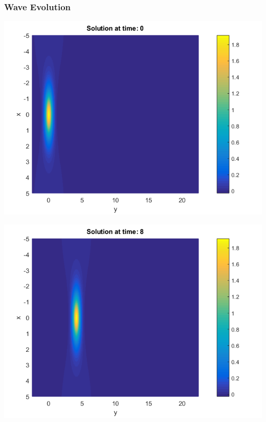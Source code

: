 \documentclass{beamer}
\begin{document}

\begin{frame}
\frametitle{Wave Evolution}
\begin{center}\vspace{0.4cm}
	\begin{minipage}[b]{0.30\linewidth}
		\includegraphics[width=\linewidth]{../amitans/figures/Solution_bt3_t=0.png}
	\end{minipage}	
	\begin{minipage}[b]{0.30\linewidth}
		\includegraphics[width=\linewidth]{../amitans/figures/Solution_bt3_t=8.png}
	\end{minipage}	
	\begin{minipage}[b]{0.30\linewidth}

\end{minipage}
\end{center}
\end{frame}
\end{document}
